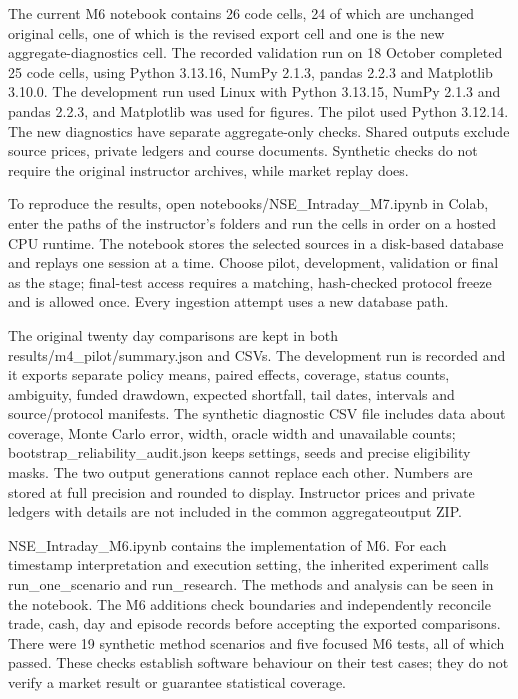\documentclass[11pt,a4paper]{article}
\begin{document}
The current M6 notebook contains 26 code cells, 24 of which are unchanged original cells, one of which is the revised export cell and one is the new aggregate-diagnostics cell. The recorded validation run on 18 October completed 25 code cells, using Python 3.13.16, NumPy 2.1.3, pandas 2.2.3 and Matplotlib 3.10.0. The development run used Linux with Python 3.13.15, NumPy 2.1.3 and pandas 2.2.3, and Matplotlib was used for figures. The pilot used Python 3.12.14. The new diagnostics have separate aggregate-only checks. Shared outputs exclude source prices, private ledgers and course documents. Synthetic checks do not require the original instructor archives, while market replay does.

To reproduce the results, open notebooks/NSE\_Intraday\_M7.ipynb in Colab, enter the paths of the instructor's folders and run the cells in order on a hosted CPU runtime. The notebook stores the selected sources in a disk-based database and replays one session at a time. Choose pilot, development, validation or final as the stage; final-test access requires a matching, hash-checked protocol freeze and is allowed once. Every ingestion attempt uses a new database path.

The original twenty day comparisons are kept in both results/m4\_pilot/summary.json and CSVs. The development run is recorded and it exports separate policy means, paired effects, coverage, status counts, ambiguity, funded drawdown, expected shortfall, tail dates, intervals and source/protocol manifests. The synthetic diagnostic CSV file includes data about coverage, Monte Carlo error, width, oracle width and unavailable counts; bootstrap\_reliability\_audit.json keeps settings, seeds and precise eligibility masks. The two output generations cannot replace each other. Numbers are stored at full precision and rounded to display. Instructor prices and private ledgers with details are not included in the common aggregate\allowbreak{}output ZIP.

NSE\_Intraday\_M6.ipynb contains the implementation of M6. For each timestamp interpretation and execution setting, the inherited experiment calls run\_one\_scenario and run\_research. The methods and analysis can be seen in the notebook. The M6 additions check boundaries and independently reconcile trade, cash, day and episode records before accepting the exported comparisons. There were 19 synthetic method scenarios and five focused M6 tests, all of which passed. These checks establish software behaviour on their test cases; they do not verify a market result or guarantee statistical coverage.
\end{document}
